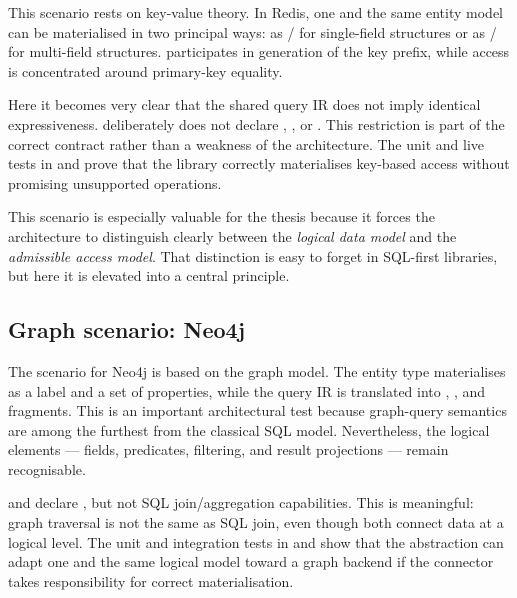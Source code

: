 This scenario rests on key-value theory. In Redis, one and the same entity model can be materialised in two principal ways: as / for single-field structures or as / for multi-field structures.  participates in generation of the key prefix, while access is concentrated around primary-key equality.

Here it becomes very clear that the shared query IR does not imply identical expressiveness.  deliberately does not declare , , or . This restriction is part of the correct contract rather than a weakness of the architecture. The unit and live tests in  and  prove that the library correctly materialises key-based access without promising unsupported operations.

This scenario is especially valuable for the thesis because it forces the architecture to distinguish clearly between the \emph{logical data model} and the \emph{admissible access model}. That distinction is easy to forget in SQL-first libraries, but here it is elevated into a central principle.

\subsection{Graph scenario: Neo4j}

The scenario for Neo4j is based on the graph model. The entity type materialises as a label and a set of properties, while the query IR is translated into , , and  fragments. This is an important architectural test because graph-query semantics are among the furthest from the classical SQL model. Nevertheless, the logical elements --- fields, predicates, filtering, and result projections --- remain recognisable.

 and  declare , but not SQL join/aggregation capabilities. This is meaningful: graph traversal is not the same as SQL join, even though both connect data at a logical level. The unit and integration tests in  and  show that the abstraction can adapt one and the same logical model toward a graph backend if the connector takes responsibility for correct materialisation.

